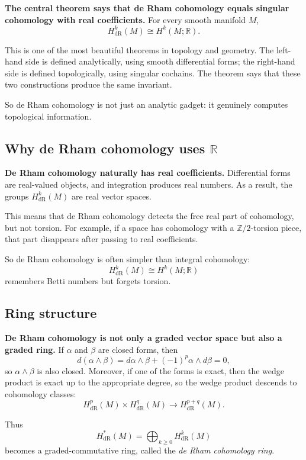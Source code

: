 \documentclass[12pt,a4paper]{article}
\theoremstyle{notespace}
\begin{document}
\textbf{The central theorem says that de Rham cohomology equals singular cohomology with real coefficients.} For every smooth manifold \(M\),
\[
H^k_{\mathrm{dR}}(M)\cong H^k(M;\mathbb{R}).
\]

This is one of the most beautiful theorems in topology and geometry. The left-hand side is defined analytically, using smooth differential forms; the right-hand side is defined topologically, using singular cochains. The theorem says that these two constructions produce the same invariant.

So de Rham cohomology is not just an analytic gadget: it genuinely computes topological information.

\subsection{Why de Rham cohomology uses \(\mathbb{R}\)}

\textbf{De Rham cohomology naturally has real coefficients.} Differential forms are real-valued objects, and integration produces real numbers. As a result, the groups \(H^k_{\mathrm{dR}}(M)\) are real vector spaces.

This means that de Rham cohomology detects the free real part of cohomology, but not torsion. For example, if a space has cohomology with a \(\mathbb{Z}/2\)-torsion piece, that part disappears after passing to real coefficients.

So de Rham cohomology is often simpler than integral cohomology:
\[
H^k_{\mathrm{dR}}(M)\cong H^k(M;\mathbb{R})
\]
remembers Betti numbers but forgets torsion.

\subsection{Ring structure}

\textbf{De Rham cohomology is not only a graded vector space but also a graded ring.} If \(\alpha\) and \(\beta\) are closed forms, then
\[
d(\alpha\wedge\beta)=d\alpha\wedge\beta+(-1)^p\alpha\wedge d\beta=0,
\]
so \(\alpha\wedge\beta\) is also closed. Moreover, if one of the forms is exact, then the wedge product is exact up to the appropriate degree, so the wedge product descends to cohomology classes:
\[
H^p_{\mathrm{dR}}(M)\times H^q_{\mathrm{dR}}(M)\to H^{p+q}_{\mathrm{dR}}(M).
\]

Thus
\[
H^*_{\mathrm{dR}}(M)=\bigoplus_{k\ge 0}H^k_{\mathrm{dR}}(M)
\]
becomes a graded-commutative ring, called the \emph{de Rham cohomology ring}.
\end{document}
